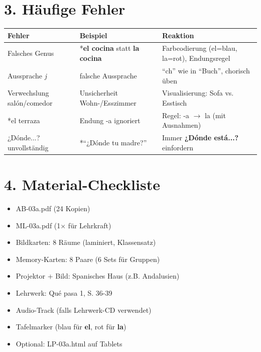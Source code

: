 \documentclass[11pt, a4paper]{article}
\newcommand{\fachfarbe}{spanisch}
\newcommand{\lerngruppengroesse}{24}
\newcommand{\es}[1]{\textcolor{\fachfarbe}{\textbf{#1}}}
\begin{document}

\section*{3. Häufige Fehler}

\begin{fehlerbox}
\begin{tabularx}{\textwidth}{|l|X|X|}
\hline
\textbf{Fehler} & \textbf{Beispiel} & \textbf{Reaktion} \\
\hline
Falsches Genus & *\es{el cocina} statt \es{la cocina} & Farbcodierung (el=blau, la=rot), Endungsregel \\
\hline
Aussprache \textit{j} & falsche Aussprache & ``ch'' wie in ``Buch'', chorisch üben \\
\hline
Verwechslung salón/comedor & Unsicherheit Wohn-/Esszimmer & Visualisierung: Sofa vs. Esstisch \\
\hline
*el terraza & Endung -a ignoriert & Regel: -a $\rightarrow$ la (mit Ausnahmen) \\
\hline
¿Dónde...? unvollständig & *``¿Dónde tu madre?'' & Immer \es{¿Dónde está...?} einfordern \\
\hline
\end{tabularx}
\end{fehlerbox}


\section*{4. Material-Checkliste}

\begin{materialbox}
\begin{itemize}[label=$\square$]
    \item AB-03a.pdf (\lerngruppengroesse{} Kopien)
    \item ML-03a.pdf (1$\times$ für Lehrkraft)
    \item Bildkarten: 8 Räume (laminiert, Klassensatz)
    \item Memory-Karten: 8 Paare (6 Sets für Gruppen)
    \item Projektor + Bild: Spanisches Haus (z.B. Andalusien)
    \item Lehrwerk: Qué pasa 1, S. 36-39
    \item Audio-Track (falls Lehrwerk-CD verwendet)
    \item Tafelmarker (blau für \es{el}, rot für \es{la})
    \item Optional: LP-03a.html auf Tablets
\end{itemize}
\end{materialbox}
\end{document}
